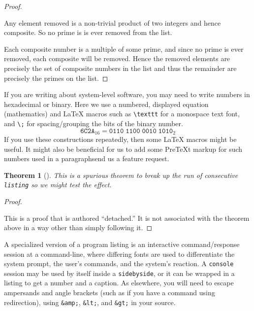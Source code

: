 \documentclass[10pt,]{article}
\theoremstyle{plain}
\newtheorem{theorem}{Theorem}[section]
\theoremstyle{definition}
\theoremstyle{definition}
\theoremstyle{definition}
\theoremstyle{definition}
\theoremstyle{definition}
\theoremstyle{definition}
\numberwithin{equation}{section}
\newenvironment{listing}{\par\bigskip\noindent}{}
\newcommand{\consoleinput}[1]{\textbf{#1}}
\begin{document}
\begin{proof}\hypertarget{proof-5}{}
\hypertarget{p-629}{}%
Any element removed is a non-trivial product of two integers and hence composite.  So no prime is is ever removed from the list.%
\par
\hypertarget{p-630}{}%
Each composite number is a multiple of some prime, and since no prime is ever removed, each composite will be removed.  Hence the removed elements are precisely the set of composite numbers in the list and thus the remainder are precisely the primes on the list.%
\end{proof}
\hypertarget{p-631}{}%
If you are writing about system-level software, you may need to write numbers in hexadecimal or binary.  Here we use a numbered, displayed equation (mathematics) and \LaTeX{} macros such as \lstinline?\texttt? for a monospace text font, and \lstinline?\;? for spacing/grouping the bits of the binary number.%
\begin{equation}
\texttt{6C2A}_{16} = \texttt{0110}\;\texttt{1100}\;\texttt{0010}\;\texttt{1010}_{2}\label{men-2}
\end{equation}
If you use these constructions repeatedly, then some \LaTeX{} macros might be useful.  It might also be beneficial for us to add some PreTeXt markup for such numbers used in a paragraph\textemdash{}send us a feature request.%
\begin{theorem}[{}]\label{theorem-2}
\hypertarget{p-632}{}%
This is a spurious theorem to break up the run of consecutive \lstinline?listing? so we might test the effect.%
\end{theorem}
\begin{proof}\hypertarget{proof-6}{}
\hypertarget{p-633}{}%
This is a proof that is authored ``detached.''  It is not associated with the theorem above in a way other than simply following it.%
\end{proof}
\hypertarget{p-634}{}%
A specialized version of a program listing is an interactive command/response session at a command-line, where differing fonts are used to differentiate the system prompt, the user's commands, and the system's reaction.  A   \lstinline?console? session may be used by itself inside a \lstinline?sidebyside?, or it can be wrapped in a listing to get a number and a caption.  As elsewhere, you will need to escape ampersands and angle brackets (such as if you have a command using redirection), using \lstinline?&amp;?, \lstinline?&lt;?, and \lstinline?&gt;? in your source.%
\begin{listing}
\par
{}

\end{listing}
\end{document}
